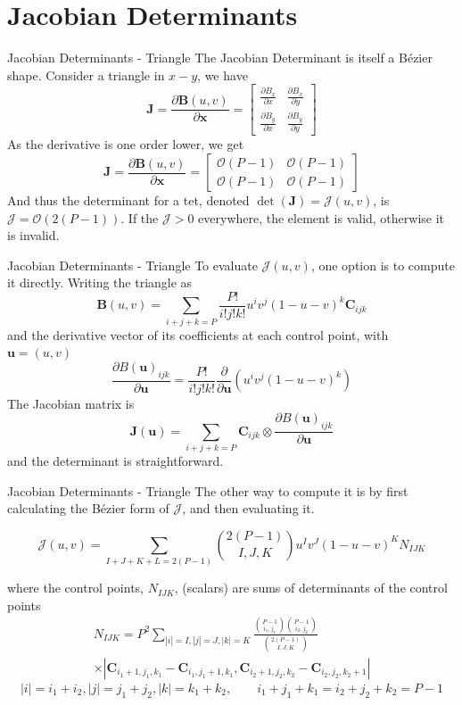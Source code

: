 \documentclass[12pt]{beamer}
\begin{document}
\section{Jacobian Determinants}
\begin{frame}{Jacobian Determinants - Triangle}
The Jacobian Determinant is itself a B{\'e}zier shape. Consider a triangle in $x-y$, we have
\[
\mathbf{J} = \frac{\partial \mathbf{B}(u,v)}{\partial \mathbf{x}} = 
\left[\begin{array}{cc} \frac{\partial B_x}{\partial x} & \frac{\partial B_x}{\partial y}  \\
\frac{\partial B_y}{\partial x} & \frac{\partial B_y}{\partial y} \end{array} \right]
\]
As the derivative is one order lower, we get
\[
\mathbf{J} = \frac{\partial \mathbf{B}(u,v)}{\partial \mathbf{x}} = 
\left[\begin{array}{cc} \mathcal{O}(P-1) & \mathcal{O}(P-1) \\ \mathcal{O}(P-1) & \mathcal{O}(P-1) \end{array} \right]
\]
And thus the determinant for a tet, denoted $\det(\mathbf{J}) = \mathcal{J}(u,v)$, is $\mathcal{J} = \mathcal{O}(2(P-1))$. If the $\mathcal{J} > 0$ everywhere, the element is valid, otherwise it is invalid.
\end{frame}
\begin{frame}{Jacobian Determinants - Triangle}
To evaluate $\mathcal{J}(u,v)$, one option is to compute it directly. Writing the triangle as
 \[ \mathbf{B}(u,v) = \displaystyle\sum_{i+j+k=P} \frac{P!}{i!j!k!}u^iv^j(1-u-v)^k\mathbf{C}_{ijk} \]
 and the derivative vector of its coefficients at each control point, with $\mathbf{u} = (u,v)$
  \[ \frac{\partial B(\mathbf{u})_{ijk}}{\partial \mathbf{u}} =\frac{P!}{i!j!k!} \frac{\partial}{\partial \mathbf{u}}\left( u^iv^j(1-u-v)^k\right) \]
The Jacobian matrix is
\[\mathbf{J}(\mathbf{u}) = \displaystyle\sum_{i+j+k=P}\mathbf{C}_{ijk} \otimes \frac{\partial B(\mathbf{u})_{ijk}}{\partial \mathbf{u}} \]
and the determinant is straightforward.
\end{frame}
\begin{frame}{Jacobian Determinants - Triangle}
The other way to compute it is by first calculating the B{\'e}zier form of $\mathcal{J}$, and then evaluating it. 
{
  \footnotesize

\[ \mathcal{J}(u,v) = \displaystyle\sum_{I+J+K+L=2(P-1)}  {2(P-1) \choose I,J,K}u^Iv^J(1-u-v)^KN_{IJK}  \]
}where the control points, $N_{IJK}$, (scalars) are sums of determinants of the control points
{
  \scriptsize
\begin{eqnarray*}
N_{IJK} = P^2 \displaystyle\sum_{|i|=I,|j|=J,|k|=K} \frac{{P-1 \choose i_1,j_1}{P-1 \choose i_2,j_2}}{ {2(P-1) \choose I,J,K}} \\  \times|\mathbf{C}_{i_1+1,j_1,k_1}-\mathbf{C}_{i_1,j_1+1,k_1},\mathbf{C}_{i_2+1,j_2,k_2}-\mathbf{C}_{i_2,j_2,k_2+1}|
\end{eqnarray*}
\[|i| = i_1+i_2, |j| = j_1+j_2, |k| = k_1+k_2, \qquad i_1+j_1+k_1 = i_2+j_2+k_2 = P-1\]
}
\end{frame}
\end{document}
